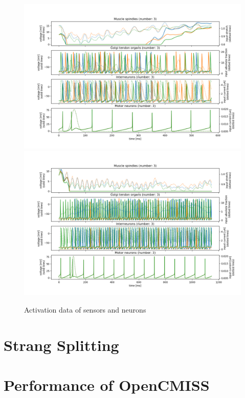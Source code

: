 \begin{figure}[H]
  \centering%
  \includegraphics[width=\textwidth]{images/results/application/neuromuscular_mileusnic_out0.png}\\
  \includegraphics[width=\textwidth]{images/results/application/neuromuscular_mileusnic_out1.png}\\
  \caption{Activation data of sensors and neurons}%
  \label{fig:neuromuscular_schematic}%
\end{figure}

\section{Strang Splitting}
\section{Performance of OpenCMISS}

